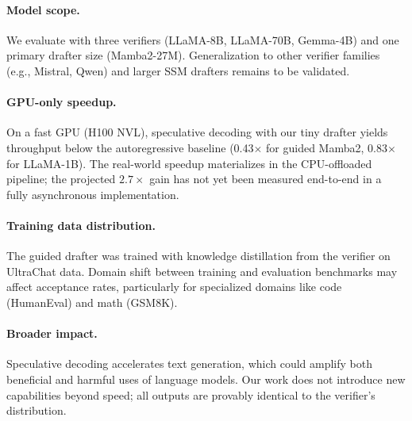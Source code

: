 \paragraph{Model scope.}
We evaluate with three verifiers (LLaMA-8B, LLaMA-70B, Gemma-4B) and one primary drafter size (Mamba2-27M).
Generalization to other verifier families (e.g., Mistral, Qwen) and larger SSM drafters remains to be validated.

\paragraph{GPU-only speedup.}
On a fast GPU (H100 NVL), speculative decoding with our tiny drafter yields throughput below the autoregressive baseline (0.43$\times$ for guided Mamba2, 0.83$\times$ for LLaMA-1B).
The real-world speedup materializes in the CPU-offloaded pipeline; the projected $2.7{\times}$ gain has not yet been measured end-to-end in a fully asynchronous implementation.

\paragraph{Training data distribution.}
The guided drafter was trained with knowledge distillation from the verifier on UltraChat data.
Domain shift between training and evaluation benchmarks may affect acceptance rates, particularly for specialized domains like code (HumanEval) and math (GSM8K).

\paragraph{Broader impact.}
Speculative decoding accelerates text generation, which could amplify both beneficial and harmful uses of language models.
Our work does not introduce new capabilities beyond speed; all outputs are provably identical to the verifier's distribution.
